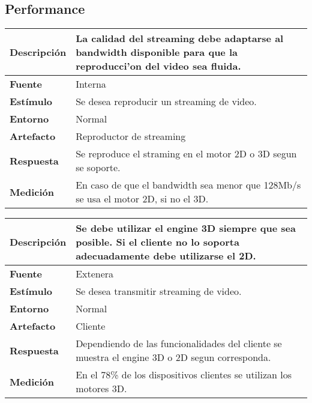\subsection{Performance}
\begin{center}
  \begin{tabular}{| l | p{10cm} | }
    \hline
  \textbf{Descripción} & La calidad del streaming debe adaptarse al bandwidth disponible para que la reproducci'on del video sea fluida.\\  \hline
  \textbf{Fuente} & Interna\\  \hline
  \textbf{Estímulo} & Se desea reproducir un streaming de video.\\  \hline
  \textbf{Entorno} & Normal\\  \hline
  \textbf{Artefacto} & Reproductor de streaming\\  \hline
  \textbf{Respuesta} & Se reproduce el straming en el motor 2D o 3D segun se soporte.\\  \hline
  \textbf{Medición} & En caso de que el bandwidth sea menor que 128Mb/s se usa el motor 2D, si no el 3D.\\  \hline
  \end{tabular}
\end{center} 


\begin{center}
  \begin{tabular}{| l | p{10cm} | }
    \hline
  \textbf{Descripción} & Se debe utilizar el engine 3D siempre que sea posible. Si el cliente no lo soporta adecuadamente debe utilizarse el 2D.\\  \hline
  \textbf{Fuente} & Extenera\\  \hline
  \textbf{Estímulo} & Se desea transmitir streaming de video.\\  \hline
  \textbf{Entorno} & Normal\\  \hline
  \textbf{Artefacto} & Cliente\\  \hline
  \textbf{Respuesta} & Dependiendo de las funcionalidades del cliente se muestra el engine 3D o 2D segun corresponda.\\  \hline
  \textbf{Medición} & En el 78\% de los dispositivos clientes se utilizan los motores 3D.\\  \hline
  \end{tabular}
\end{center} 



